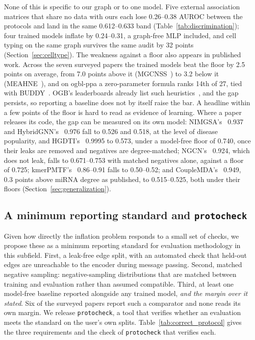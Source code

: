 \documentclass[review]{elsarticle}
\begin{document}
None of this is specific to our graph or to one model. Five external association matrices that share no data
with ours each lose 0.26--0.38 AUROC between the protocols and land in the same 0.612--0.633 band
(Table~\ref{tab:discrimination}); four trained models inflate by 0.24--0.31, a graph-free MLP
included, and cell typing on the same graph survives the same audit by 32 points (Section~\ref{sec:celltype}). The
weakness against a floor also appears in published work. Across the seven surveyed papers the trained models
beat the floor by 2.5 points on average, from 7.0 points above it (MGCNSS~\cite{tian2024mgcnss}) to 3.2 below it (MEAHNE~\cite{huang2022meahne}), and on
ogbl-ppa a zero-parameter formula ranks 14th of 27, tied with BUDDY~\cite{chamberlain2023buddy}. OGB's leaderboards already list such heuristics~\cite{ogb2026leaderboard}, and the
gap persists, so reporting a baseline does not by itself raise the bar. A headline within a few points of the
floor is hard to read as evidence of learning. Where a paper releases its code, the gap can be measured on
its own model: NIMGSA's~\cite{jin2022nimgsa} 0.937 and HybridGNN's~\cite{ahmad2026hybridgnn} 0.976 fall to
0.526 and 0.518, at the level of disease popularity, and HGDTI's~\cite{yu2022hgdti} 0.9995 to 0.573, under a
model-free floor of 0.740, once their leaks are removed and negatives are
degree-matched; NGCN's~\cite{cao2024ngcn} 0.924, which does not leak, falls to 0.671--0.753 with matched negatives
alone, against a floor of 0.725; kmerPMTF's~\cite{zhang2024kmerpmtf} 0.86--0.91 falls to 0.50--0.52; and
CoupleMDA's~\cite{li2025couplemda} 0.949, 0.3 points above miRNA degree as published, to 0.515--0.525, both under
their floors (Section~\ref{sec:generalization}).

\subsection{A minimum reporting standard and \texttt{protocheck}}
\label{sec:standard}
Given how directly the inflation problem responds to a small set of checks, we propose these as a minimum reporting standard for evaluation methodology in this subfield. First, a leak-free edge split, with an automated check that held-out edges are unreachable to the encoder during message passing. Second, matched negative sampling: negative-sampling distributions that are matched between training and evaluation rather than assumed compatible. Third, at least one model-free baseline reported alongside any trained model, \emph{and the margin over it stated}. Six of the surveyed papers report such a comparator and none reads its own margin. We release \texttt{protocheck}, a tool that verifies whether an evaluation meets the standard on the user's own splits. Table~\ref{tab:correct_protocol} gives the three requirements and the check of \texttt{protocheck} that verifies each.
\end{document}
